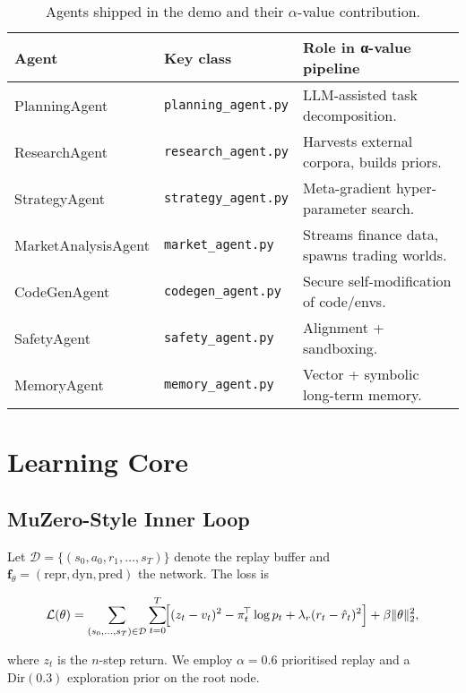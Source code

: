 \begin{table}[ht]\centering
\caption{Agents shipped in the demo and their $\alpha$-value contribution.}
\label{tab:agents}
\begin{tabular}{@{}lll@{}}
\toprule
\textbf{Agent} & \textbf{Key class} & \textbf{Role in α-value pipeline}\\
\midrule
PlanningAgent      & \texttt{planning\_agent.py}   & LLM-assisted task decomposition.\\
ResearchAgent      & \texttt{research\_agent.py}   & Harvests external corpora, builds priors.\\
StrategyAgent      & \texttt{strategy\_agent.py}   & Meta-gradient hyper-parameter search.\\
MarketAnalysisAgent& \texttt{market\_agent.py}     & Streams finance data, spawns trading worlds.\\
CodeGenAgent       & \texttt{codegen\_agent.py}    & Secure self-modification of code/envs.\\
SafetyAgent        & \texttt{safety\_agent.py}     & Alignment + sandboxing.\\
MemoryAgent        & \texttt{memory\_agent.py}     & Vector + symbolic long-term memory.\\
\bottomrule
\end{tabular}
\end{table}

\section{Learning Core}

\subsection{MuZero-Style Inner Loop}

Let \(\mathcal{D}=\{(s_0,a_0,r_1,\ldots,s_T)\}\) denote the replay buffer and
\(\mathbf{f}_\theta=(\mathrm{repr},\mathrm{dyn},\mathrm{pred})\) the network.
The loss is

\[
\mathcal{L}(\theta)=
\sum_{(s_0,\dots,s_T)\in\mathcal{D}}
\sum_{t=0}^{T}\!\Bigl[
    (z_t-v_t)^2
  -\pi_t^{\!\top}\log p_t
  +\lambda_r(r_t-\hat r_t)^2
\Bigr]
+\beta\lVert\theta\rVert_2^2,
\]

where \(z_t\) is the \(n\)-step return.  
We employ \(\alpha=0.6\) prioritised replay and a
\(\text{Dir}(0.3)\) exploration prior on the root node.

